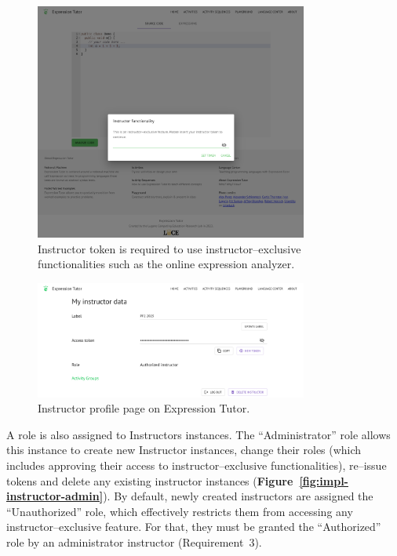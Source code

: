 \begin{chapterBody}
\begin{figure}[ht]
    \centering
    \includegraphics[width=0.8\textwidth]{res/6/instructor_token.png}
    \caption{Instructor token is required to use instructor–exclusive
functionalities such as the online expression analyzer.}
    \label{fig:impl-instructor-token}
\end{figure}

\begin{figure}[ht]
    \centering
    \includegraphics[width=0.8\textwidth]{res/6/instructor_profile.png}
    \caption{Instructor profile page on Expression Tutor.}
    \label{fig:impl-instructor-profile}
\end{figure}

A role is also assigned to Instructors instances. The ``Administrator'' role
allows this instance to create new Instructor instances, change their roles
(which includes approving their access to instructor–exclusive
functionalities), re–issue tokens and delete any existing instructor instances
(\textbf{Figure~\ref{fig:impl-instructor-admin}}).
By default, newly created instructors are assigned the ``Unauthorized'' role,
which effectively restricts them from accessing any instructor–exclusive 
feature.
For that, they must be granted the ``Authorized'' role by an administrator
instructor (Requirement~3).


\end{chapterBody}
